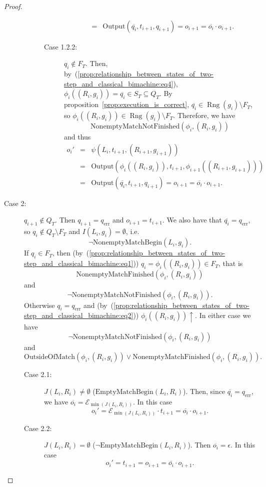 \documentclass{article}
\DeclareMathOperator{\Rng}{Rng}
\begin{document}
\begin{proof}
\begin{description}
\begin{description}
\begin{description}
\begin{eqnarray*}
							&=& \mathrm{Output}(\overline{q_i}, t_{i+1}, q_{i+1}) = o_{i+1} = \overline{o_i}\cdot o_{i+1}.
					\end{eqnarray*}
				\item[Case 1.2.2:] $q_i\notin F_T$.
					Then, by~(\ref{prop:relationship_between_states_of_two-step_and_classical_bimachine:eq4}), $\phi_i((R_i, g_i)) = \overline{q_i}\in S_T\subseteq Q_T$.
					By proposition~\ref{prop:execution_is_correct}, $\overline{q_i}\in \Rng(g_i)\setminus F_T$, so $\phi_i((R_i, g_i))\in \Rng(g_i)\setminus F_T$. Therefore, we have
					\[ \mathrm{NonemptyMatchNotFinished}(\phi_i, (R_i, g_i)) \]
					and thus
					\begin{eqnarray*}
						o_i' &=& \psi(L_i, t_{i+1}, (R_{i+1}, g_{i+1})) \\
							&=& \mathrm{Output}(\phi_i((R_i, g_i)), t_{i+1}, \phi_{i+1}((R_{i+1}, g_{i+1}))) \\
							&=& \mathrm{Output}(\overline{q_i}, t_{i+1}, q_{i+1}) = o_{i+1} = \overline{o_i}\cdot o_{i+1}.
					\end{eqnarray*}
				\end{description}
			\end{description}
		\item[Case 2:] $q_{i+1}\notin Q_T$. Then $q_{i+1} = q_\mathrm{err}$ and $o_{i+1} = t_{i+1}$.
			We also have that $\overline{q_i} = q_\mathrm{err}$, so $q_i\notin Q_T\setminus F_T$ and $I(L_i, g_i) = \emptyset$, i.e.
			\[ \lnot\mathrm{NonemptyMatchBegin}(L_i, g_i). \]
			If $q_i\in F_T$, then (by~(\ref{prop:relationship_between_states_of_two-step_and_classical_bimachine:eq1})) $q_i = \phi_i((R_i, g_i))\in F_T$, that is
			\[ \mathrm{NonemptyMatchFinished}(\phi_i, (R_i, g_i)) \]
			and 
			\[ \lnot\mathrm{NonemptyMatchNotFinished}(\phi_i, (R_i, g_i)). \]
			Otherwise $q_i = q_\mathrm{err}$ and (by~(\ref{prop:relationship_between_states_of_two-step_and_classical_bimachine:eq2})) $\phi_i((R_i, g_i))\uparrow$.
			In either case we have
			\[ \lnot\mathrm{NonemptyMatchNotFinished}(\phi_i, (R_i, g_i)) \]
			and
			\[ \mathrm{OutsideOfMatch}(\phi_i, (R_i, g_i))\mathbin\lor\mathrm{NonemptyMatchFinished}(\phi_i, (R_i, g_i)). \]
			\begin{description}
			\item[Case 2.1:] $J(L_i, R_i)\ne\emptyset$ ($\mathrm{EmptyMatchBegin}(L_i, R_i)$).
				Then, since $\overline{q_i} = q_\mathrm{err}$, we have $\overline{o_i} = \mathcal{E}_{\min(J(L_i, R_i))}$.
				In this case
				\[ o_i' = \mathcal{E}_{\min(J(L_i, R_i))}\cdot t_{i+1} = \overline{o_i}\cdot o_{i+1}. \]
			\item[Case 2.2:] $J(L_i, R_i) = \emptyset$ ($\lnot\mathrm{EmptyMatchBegin}(L_i, R_i)$).
				Then $\overline{o_i} = \epsilon$. In this case
				\[ o_i' = t_{i+1} = o_{i+1} = \overline{o_i}\cdot o_{i+1}. \]
			\end{description}
		\end{description}
	\end{proof}
\end{document}
